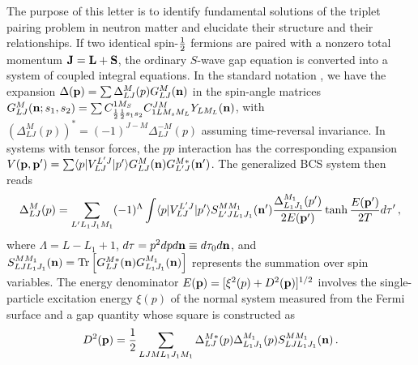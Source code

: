 The purpose of this letter is to identify fundamental solutions of the
triplet pairing problem in neutron matter and elucidate their structure
and their relationships.  If two identical spin-${1\over 2}$ fermions 
are paired with a nonzero total momentum ${\bf J}={\bf L}+{\bf S}$, 
the ordinary $S$-wave gap equation is converted into a system 
of coupled integral equations.  In the standard notation \cite{tak,ost}, 
we have the expansion
$\Delta({\bf p}) =\sum\Delta_{LJ}^M(p)G_{LJ}^M({\bf n})$ 
in the spin-angle matrices 
$G_{LJ}^M({\bf n};s_1,s_2)=\sum C^{1M_S}_{{1\over 2}
{1\over 2}s_1s_2}C^{JM}_{1LM_sM_L}Y_{LM_L}({\bf n})$, 
with $(\Delta_{LJ}^M(p))^*=(-1)^{J-M}\Delta_{LJ}^{-M}(p)$ assuming
time-reversal invariance.  In systems with  tensor forces, the
$pp$ interaction has the corresponding expansion 
$V({\bf p},{\bf p}')=\sum\langle p|V_{LJ}^{L'J}|p'
\rangle G_{LJ}^M({\bf n})G_{L'J}^{M*}({\bf n}')$.
The generalized BCS system then reads
\begin{equation}
 \Delta_{LJ}^M(p)
= \sum_{L'L_1J_1M_1}(-1)^{\Lambda} \int 
  \langle p|V_{LJ}^{L'J}|p'\rangle S^{MM_1}_{L'JL_1J_1}({\bf n}')
  {\Delta_{L_1J_1}^{M_1}(p')\over 2E({\bf p}')}
  \tanh {E({\bf p}') \over 2T}d\tau' \, ,
\end{equation}
where $\Lambda=L-L_1+1$, $d\tau= p^2dpd{\bf n} \equiv d\tau_0d{\bf n}$, 
and $S^{MM_1}_{LJL_1J_1}({\bf n})={\rm Tr}
\left[G_{LJ}^{M*}({\bf n})G_{L_1J_1}^{M_1}({\bf n})\right]$ 
represents the summation over spin variables.  The energy denominator
$E({\bf p})=[\xi^2(p)+D^2({\bf p})]^{1/2}$ involves
the single-particle excitation energy $\xi(p)$ of the
normal system measured from the Fermi surface and a gap quantity
whose square is constructed as
\begin{equation}
 D^2({\bf p})={1\over 2}\sum_{LJML_1J_1M_1}\Delta_{LJ}^{M*}(p)
 \Delta_{L_1J_1}^{M_1}(p) S^{MM_1}_{LJL_1J_1}({\bf n}) \, .
\end{equation}

